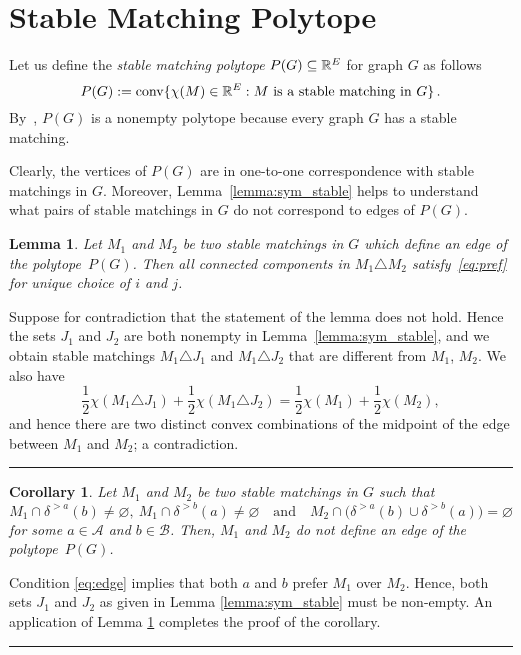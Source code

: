 \documentclass[preprint]{elsarticle}
\newtheorem{lemma}[fact]{Lemma}
\newtheorem{corollary}[fact]{Corollary}
\newenvironment{proof}{{\bf Proof:  }}{\hfill\rule{2mm}{2mm}}
\DeclareMathOperator{\convOp}{conv}
\newcommand{\conv}{\convOp}
\begin{document}
\section{Stable Matching Polytope}

Let us define the \emph{stable matching polytope} $P(G)\subseteq\mathbb{R}^E$ for graph $G$ as follows
$$
	P(G):=\conv\{\chi(M)\in\R^E: M \text{ is a stable matching in } G\}\,.
$$
By~\cite{gale1962college}, $P(G)$ is a nonempty polytope because every
graph $G$ has a stable matching.

Clearly, the vertices of $P(G)$ are in one-to-one correspondence with
stable matchings in $G$. Moreover, Lemma~\ref{lemma:sym_stable} helps
to understand what pairs of stable matchings in $G$ do not correspond
to edges of $P(G)$.

\begin{lemma}\label{lemma:edge}
  Let $M_1$ and $M_2$ be two stable matchings in $G$ which define an
  edge of the polytope~$P(G)$. 
  Then all connected components in
  $M_1\triangle M_2$ satisfy~\eqref{eq:pref} for unique choice of $i$
  and $j$. 
\end{lemma}
\begin{proof}
  Suppose for contradiction that the statement of the lemma does not
  hold. Hence the sets $J_1$ and $J_2$ are both nonempty in
  Lemma~\ref{lemma:sym_stable}, and we obtain stable matchings
  $M_1\triangle J_1$ and $M_1\triangle J_2$ that are different from $M_1$,
  $M_2$. 
  We also have 
  \[ \frac{1}{2}\chi(M_1\triangle J_1)+\frac{1}{2}\chi(M_1\triangle
  J_2) =\frac{1}{2}\chi(M_1)+\frac{1}{2}\chi(M_2),\]
  and hence there are two distinct convex combinations of the midpoint
  of the edge between $M_1$ and $M_2$; a contradiction. 
\end{proof}


\begin{corollary}\label{cor:edge}
Let $M_1$ and $M_2$ be two stable matchings in $G$ such that
\begin{equation}\label{eq:edge}
M_1\cap\delta^{>a}(b)\neq\varnothing,\
M_1\cap\delta^{>b}(a)\neq\varnothing\quad\text{and}\quad
M_2\cap\big(\delta^{>a}(b)\cup \delta^{>b}(a)\big)=\varnothing
\end{equation}
 for some $a\in\mathcal{A}$ and $b\in\mathcal{B}$. Then, $M_1$ and $M_2$ do not define an edge of the polytope~$P(G)$.
\end{corollary}
\begin{proof}
  Condition \eqref{eq:edge} implies that both $a$ and $b$ prefer
  $M_1$ over $M_2$. Hence, both sets $J_1$ and $J_2$ as given in Lemma
  \ref{lemma:sym_stable} must be non-empty. An application of Lemma
  \ref{lemma:edge} completes the proof of the corollary.
\end{proof}
\end{document}
